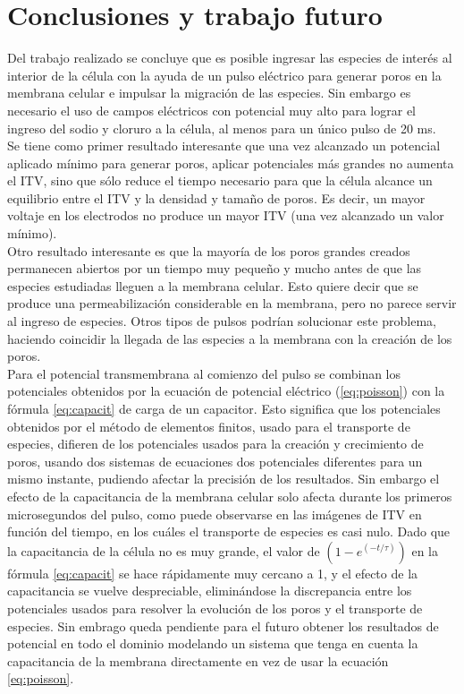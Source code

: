 \documentclass[a4paper,10pt]{article}
\begin{document}
\newpage\clearpage
\section{Conclusiones y trabajo futuro}

Del trabajo realizado se concluye que es posible ingresar las especies de interés al interior de la célula con la ayuda de un pulso eléctrico para generar poros en la membrana celular e impulsar la migración de las especies. Sin embargo es necesario el uso de campos eléctricos con potencial muy alto para lograr el ingreso del sodio y cloruro a la célula, al menos para un único pulso de 20 ms. \\

Se tiene como primer resultado interesante que una vez alcanzado un potencial aplicado mínimo para generar poros, aplicar potenciales más grandes no aumenta el ITV, sino que sólo reduce el tiempo necesario para que la célula alcance un equilibrio entre el ITV y la densidad y tamaño de poros. Es decir, un mayor voltaje en los electrodos no produce un mayor ITV (una vez alcanzado un valor mínimo).\\

Otro resultado interesante es que la mayoría de los poros grandes creados permanecen abiertos por un tiempo muy pequeño y mucho antes de que las especies estudiadas lleguen a la membrana celular. Esto quiere decir que se produce una permeabilización considerable en la membrana, pero no parece servir al ingreso de especies. Otros tipos de pulsos podrían solucionar este problema, haciendo coincidir la llegada de las especies a la membrana con la creación de los poros.\\

Para el potencial transmembrana al comienzo del pulso se combinan los potenciales obtenidos por la ecuación de potencial eléctrico (\ref{eq:poisson}) con la fórmula \ref{eq:capacit} de carga de un capacitor. Esto significa que los potenciales obtenidos por el método de elementos finitos, usado para el transporte de especies, difieren de los potenciales usados para la creación y crecimiento de poros, usando dos sistemas de ecuaciones dos potenciales diferentes para un mismo instante, pudiendo afectar la precisión de los resultados. Sin embargo el efecto de la capacitancia de la membrana celular solo afecta durante los primeros microsegundos del pulso, como puede observarse en las imágenes de ITV en función del tiempo, en los cuáles el transporte de especies es casi nulo. Dado que la capacitancia de la célula no es muy grande, el valor de $(1 - e^{(-t/\tau)})$ en la fórmula \ref{eq:capacit} se hace rápidamente muy cercano a 1, y el efecto de la capacitancia se vuelve despreciable, eliminándose la discrepancia entre los potenciales usados para resolver la evolución de los poros y el transporte de especies. Sin embrago queda pendiente para el futuro obtener los resultados de potencial en todo el dominio modelando un sistema que tenga en cuenta la capacitancia de la membrana directamente en vez de usar la ecuación \ref{eq:poisson}.\\
\end{document}
